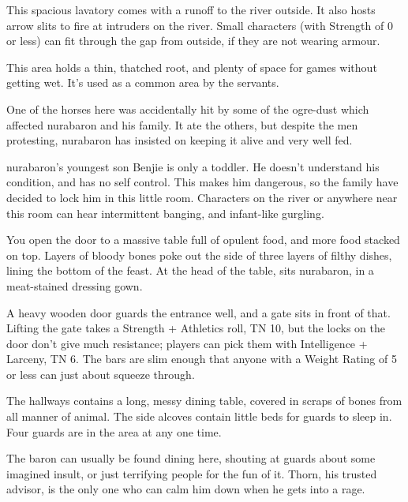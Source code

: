 This spacious lavatory comes with a runoff to the river outside.
It also hosts arrow slits to fire at intruders on the river.
Small characters (with Strength of 0 or less) can fit through the gap from outside, if they are not wearing armour.


This area holds a thin, thatched root, and plenty of space for games without getting wet.
It's used as a common area by the servants.


One of the horses here was accidentally hit by some of the ogre-dust which affected \gls{nurabaron} and his family.  It ate the others, but despite the men protesting, \gls{nurabaron} has insisted on keeping it alive and very well fed.


\Gls{nurabaron}'s youngest son Benjie is only a toddler.
He doesn't understand his condition, and has no self control.
This makes him dangerous, so the family have decided to lock him in this little room.
Characters on the river or anywhere near this room can hear intermittent banging, and infant-like gurgling.


\begin{boxtext}

  You open the door to a massive table full of opulent food, and more food stacked on top.  Layers of bloody bones poke out the side of three layers of filthy dishes, lining the bottom of the feast.  At the head of the table, sits \gls{nurabaron}, in a meat-stained dressing gown.

\end{boxtext}

A heavy wooden door guards the entrance well, and a gate sits in front of that.  Lifting the gate takes a Strength + Athletics roll, TN 10, but the locks on the door don't give much resistance; players can pick them with Intelligence + Larceny, TN 6.  The bars are slim enough that anyone with a Weight Rating of 5 or less can just about squeeze through.

The hallways contains a long, messy dining table, covered in scraps of bones from all manner of animal.  The side alcoves contain little beds for guards to sleep in.  Four guards are in the area at any one time.

The baron can usually be found dining here, shouting at guards about some imagined insult, or just terrifying people for the fun of it.  Thorn, his trusted advisor, is the only one who can calm him down when he gets into a rage.

